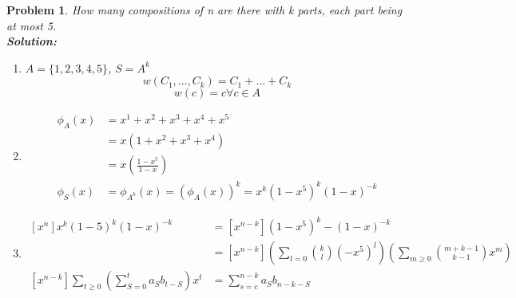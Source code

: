 \documentclass{article}
\newtheorem{expx}[theorem]{Problem}
\begin{document}
\newpage 
\begin{expx} How many compositions of n are there with k parts, each part being at most 5. \\
\textbf{Solution:}
\begin{enumerate}
\item \(A = \{1, 2, 3, 4, 5\} \), \(S = A^k\) 
\[w(C_1, \ldots, C_k) = C_1 + \ldots + C_k\] 
\[w(c) = c \forall c \in A \] 
\item \[\begin{aligned}
\phi_A(x) & = x^1 + x^2 + x^3 + x^4 + x^5 \\
& = x(1 + x^2 + x^3 + x^4) \\
& = x\left(\frac{1-x^5}{1-x}\right) \\
\phi_S(x)& = \phi_{A^k} (x) = (\phi_A(x))^k = x^k (1-x^5)^k (1-x)^{-k}
\end{aligned}\]
\item 
\[\begin{aligned}
[x^n] x^k (1-5)^k (1-x)^{-k} & = [x^{n-k}] (1-x^5)^k - (1-x)^{-k} \\
& = [x^{n-k}] \left(\sum_{l = 0} {k \choose l} (-x^5)^l\right)\left(\sum_{m \geq 0} {{m+k-1} \choose {k-1}} x^m \right) \\
[x^{n-k}] \sum_{t \geq 0} \left(\sum_{S=0}^t a_S b_{t - S} \right) x^t & = \sum_{s =c }^{n -k} a_S b_{n-k-S}
\end{aligned}
\]
\end{enumerate}
\end{expx}
\end{document}
